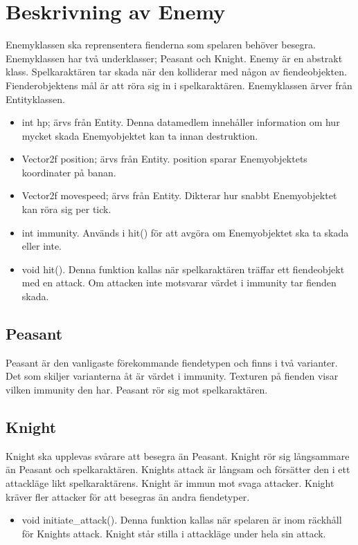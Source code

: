 \documentclass{TDP005mall}
\begin{document}
\section{Beskrivning av Enemy}
Enemyklassen ska reprensentera fienderna som spelaren behöver besegra. 
Enemyklassen har två underklasser; Peasant och Knight.
Enemy är en abstrakt klass. 
Spelkaraktären tar skada när den kolliderar med någon av fiendeobjekten. 
Fienderobjektens mål är att röra sig in i spelkaraktären. 
Enemyklassen ärver från Entityklassen.
\begin{itemize}
\item int hp; ärvs från Entity. 
    Denna datamedlem innehåller information om hur mycket skada Enemyobjektet kan ta innan destruktion.
\item Vector2f position; ärvs från Entity. 
    position sparar Enemyobjektets koordinater på banan.
\item Vector2f movespeed; ärvs från Entity. Dikterar hur snabbt Enemyobjektet kan röra sig per tick.
\item int immunity.
  Används i hit() för att avgöra om Enemyobjektet ska ta skada eller inte.
\item void hit().
    Denna funktion kallas när spelkaraktären träffar ett fiendeobjekt med en attack. 
    Om attacken inte motsvarar värdet i immunity tar fienden skada.
\end{itemize}
\subsection{Peasant}
Peasant är den vanligaste förekommande fiendetypen och finns i två varianter. 
Det som skiljer varianterna åt är värdet i immunity. 
Texturen på fienden visar vilken immunity den har.
Peasant rör sig mot spelkaraktären. 
\subsection{Knight}
Knight ska upplevas svårare att besegra än Peasant. 
Knight rör sig långsammare än Peasant och spelkaraktären. 
Knights attack är långsam och försätter den i ett attackläge likt spelkaraktärens. 
Knight är immun mot svaga attacker. 
Knight kräver fler attacker för att besegras än andra fiendetyper.
\begin{itemize}
\item void initiate\_attack(). Denna funktion kallas när spelaren är inom räckhåll för Knights attack. 
    Knight står stilla i attackläge under hela sin attack.
\end{itemize}
\newpage
\end{document}
